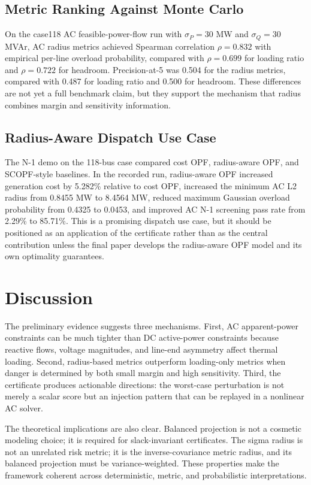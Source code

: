 \documentclass[11pt]{article}
\begin{document}
\subsection{Metric Ranking Against Monte Carlo}

On the case118 AC feasible-power-flow run with $\sigma_P=30$ MW and $\sigma_Q=30$ MVAr, AC radius metrics achieved Spearman correlation $\rho=0.832$ with empirical per-line overload probability, compared with $\rho=0.699$ for loading ratio and $\rho=0.722$ for headroom. Precision-at-5 was 0.504 for the radius metrics, compared with 0.487 for loading ratio and 0.500 for headroom. These differences are not yet a full benchmark claim, but they support the mechanism that radius combines margin and sensitivity information.

\subsection{Radius-Aware Dispatch Use Case}

The N-1 demo on the 118-bus case compared cost OPF, radius-aware OPF, and SCOPF-style baselines. In the recorded run, radius-aware OPF increased generation cost by 5.282\% relative to cost OPF, increased the minimum AC L2 radius from 0.8455 MW to 8.4564 MW, reduced maximum Gaussian overload probability from 0.4325 to 0.0453, and improved AC N-1 screening pass rate from 2.29\% to 85.71\%. This is a promising dispatch use case, but it should be positioned as an application of the certificate rather than as the central contribution unless the final paper develops the radius-aware OPF model and its own optimality guarantees.

\section{Discussion}
\label{sec:discussion}

The preliminary evidence suggests three mechanisms. First, AC apparent-power constraints can be much tighter than DC active-power constraints because reactive flows, voltage magnitudes, and line-end asymmetry affect thermal loading. Second, radius-based metrics outperform loading-only metrics when danger is determined by both small margin and high sensitivity. Third, the certificate produces actionable directions: the worst-case perturbation is not merely a scalar score but an injection pattern that can be replayed in a nonlinear AC solver.

The theoretical implications are also clear. Balanced projection is not a cosmetic modeling choice; it is required for slack-invariant certificates. The sigma radius is not an unrelated risk metric; it is the inverse-covariance metric radius, and its balanced projection must be variance-weighted. These properties make the framework coherent across deterministic, metric, and probabilistic interpretations.
\end{document}
